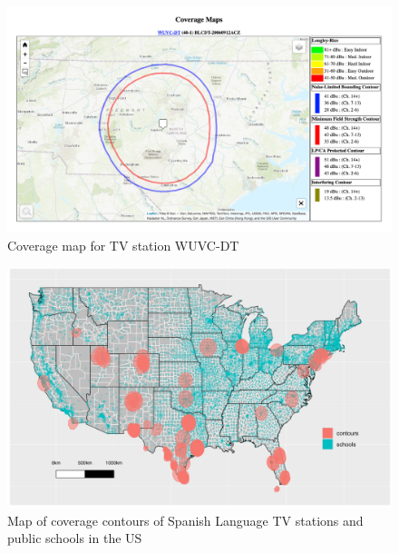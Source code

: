 \documentclass[11pt]{article}
\begin{document}
\begin{figure}[!hbtp]
\centering
\caption{Coverage map for TV station WUVC-DT}\label{f:contour_example}
\includegraphics[width=14.5cm]{../../analysis/Output/img/ContourExample.png}
\end{figure} 

\begin{figure}[!hbtp]
\centering
\caption{Map of coverage contours of Spanish Language TV stations and public schools in the US}\label{f:contours_schools}
\includegraphics[width=14.5cm]{../../analysis/Output/img/Schools_pretty2.pdf}
\end{figure} 

\clearpage
\end{document}
